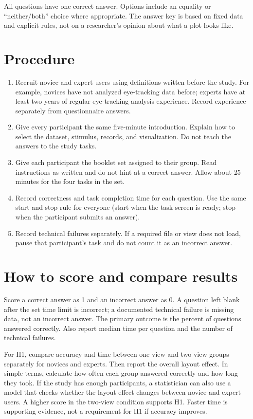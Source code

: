 \documentclass[11pt]{article}
\begin{document}
All questions have one correct answer. Options include an equality or
``neither/both'' choice where appropriate. The answer key is based on fixed
data and explicit rules, not on a researcher's opinion about what a plot looks
like.

\section{Procedure}
\begin{enumerate}
  \item Recruit novice and expert users using definitions written before the
  study. For example, novices have not analyzed eye-tracking data before;
  experts have at least two years of regular eye-tracking analysis experience.
  Record experience separately from questionnaire answers.
  \item Give every participant the same five-minute introduction. Explain how
  to select the dataset, stimulus, records, and visualization. Do not teach the
  answers to the study tasks.
  \item Give each participant the booklet set assigned to their group. Read
  instructions as written and do not hint at a correct answer. Allow about 25
  minutes for the four tasks in the set.
  \item Record correctness and task completion time for each question. Use the
  same start and stop rule for everyone (start when the task screen is ready;
  stop when the participant submits an answer).
  \item Record technical failures separately. If a required file or view does
  not load, pause that participant's task and do not count it as an incorrect
  answer.
\end{enumerate}

\section{How to score and compare results}
Score a correct answer as 1 and an incorrect answer as 0. A question left blank
after the set time limit is incorrect; a documented technical failure is
missing data, not an incorrect answer. The primary outcome is the percent of
questions answered correctly. Also report median time per question and the
number of technical failures.

For H1, compare accuracy and time between one-view and two-view groups
separately for novices and experts. Then report the overall layout effect. In
simple terms, calculate how often each group answered correctly and how long
they took. If the study has enough participants, a statistician can also use a
model that checks whether the layout effect changes between novice and expert
users. A higher score in the two-view condition supports H1. Faster time is
supporting evidence, not a requirement for H1 if accuracy improves.
\end{document}
